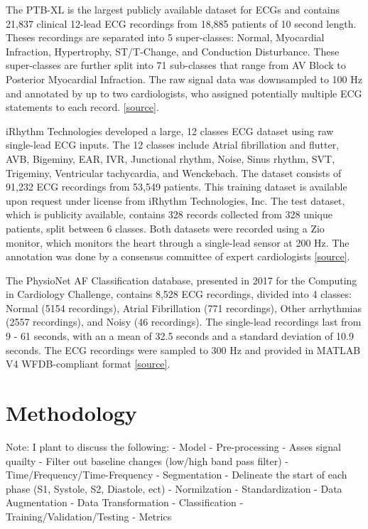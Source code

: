 \documentclass{article}
\begin{document}
The PTB-XL is the largest publicly available dataset for ECGs and contains 21,837 clinical 12-lead ECG recordings from 18,885 patients of 10 second length. Theses recordings are separated into 5 super-classes: Normal, Myocardial Infraction, Hypertrophy, ST/T-Change, and Conduction Disturbance. These super-classes are further split into 71 sub-classes that range from AV Block to Posterior Myocardial Infraction. The raw signal data was downsampled to 100 Hz and annotated by up to two cardiologists, who assigned potentially multiple ECG statements to each record.
\href{https://physionet.org/content/ptb-xl/1.0.1/}{[source]}.

iRhythm Technologies developed a large, 12 classes ECG dataset using raw single-lead ECG inputs. The 12 classes include Atrial fibrillation and flutter, AVB, Bigeminy, EAR, IVR, Junctional rhythm, Noise, Sinus rhythm, SVT, Trigeminy, Ventricular tachycardia, and Wenckebach. The dataset consists of 91,232 ECG recordings from 53,549 patients. This training dataset is available upon request under license from iRhythm Technologies, Inc. The test dataset, which is publicity available, contains 328 records collected from 328 unique patients, split between 6 classes. Both datasets were recorded using a Zio monitor, which monitors the heart through a single-lead sensor at  200 Hz. The annotation was done by a consensus committee of expert cardiologists \href{https://www.nature.com/articles/s41591-018-0268-3}{[source]}.

The PhysioNet AF Classification database, presented in 2017 for the Computing in Cardiology Challenge, contains 8,528 ECG recordings, divided into 4 classes: Normal (5154 recordings), Atrial Fibrillation (771 recordings), Other arrhythmias (2557 recordings), and Noisy (46 recordings). The single-lead recordings last from 9 - 61 seconds, with an a mean of 32.5 seconds and a standard deviation of 10.9 seconds. The ECG recordings were sampled to 300 Hz and provided in MATLAB V4 WFDB-compliant format \href{https://physionet.org/content/challenge-2017/1.0.0/}{[source]}.

\section{Methodology}
Note: I plant to discuss the following: 
- Model
- Pre-processing
    - Asses signal quailty
    - Filter out baseline changes (low/high band pass filter)
    - Time/Frequency/Time-Frequency
- Segmentation
    - Delineate the start of each phase (S1, Systole, S2, Diastole, ect)
- Normilzation
- Standardization
- Data Augmentation
- Data Transformation
- Classification
- Training/Validation/Testing
- Metrics
\end{document}
